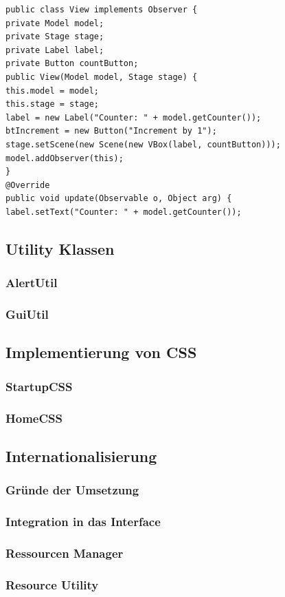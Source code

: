\begin{lstlisting}[style=java,caption=Die Klasse View,label=View]
public class View implements Observer {
private Model model;
private Stage stage;
private Label label;
private Button countButton;
public View(Model model, Stage stage) {
this.model = model;
this.stage = stage;
label = new Label("Counter: " + model.getCounter());
btIncrement = new Button("Increment by 1");
stage.setScene(new Scene(new VBox(label, countButton)));
model.addObserver(this);
}
@Override
public void update(Observable o, Object arg) {
label.setText("Counter: " + model.getCounter());
\end{lstlisting}
\subsection{Utility Klassen}
\subsubsection{AlertUtil}
\subsubsection{GuiUtil}
\subsection{Implementierung von CSS}
\subsubsection{StartupCSS}
\subsubsection{HomeCSS}
\subsection{Internationalisierung}
\subsubsection{Gründe der Umsetzung}
\subsubsection{Integration in das Interface}
\subsubsection{Ressourcen Manager}
\subsubsection{Resource Utility}
